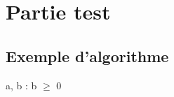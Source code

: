 \section{Partie test}

\subsection{Exemple d'algorithme}

\begin{algorithme} 
    {a, b : \reel}{\reel}
    {b $\geq$ 0}{} {} 
\end{algorithme}